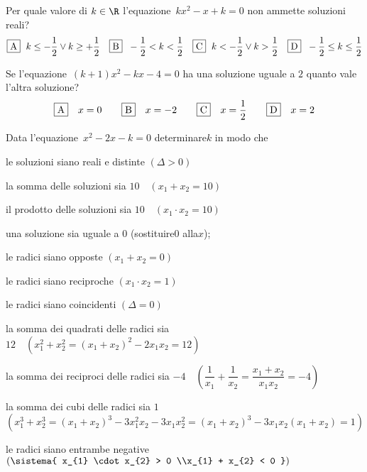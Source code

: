 \begin{esercizio}
 \label{ese:3.105}
 Per quale valore di \(k \in \R\) l'equazione~\(kx^{2}-x + k = 0\) non 
ammette soluzioni reali?
\[\fbox{A}\;~ k \leq-\dfrac{1}{2} \vee k \geq + \dfrac{1}{2}\quad\fbox{B}\;~ 
- 
\dfrac{1}{2} 
< k < \dfrac{1}{2}\quad\fbox{C}\;~ k <-\dfrac{1}{2} \vee k > 
\dfrac{1}{2}\quad\fbox{D}\;~ - 
\dfrac{1}{2} \leq k \leq \dfrac{1}{2}\]
\end{esercizio}

\begin{esercizio}
 \label{ese:3.111}
Se l'equazione~\((k + 1) x^{2}-kx-4 = 0\) ha una soluzione uguale a \(2\) 
quanto 
vale l'altra soluzione?
\[\fbox{A}\quad x = 0\qquad\fbox{B}\quad x =-2\qquad\fbox{C}\quad x = 
\dfrac{1}{2}\qquad\fbox{D}\quad x = 2\]
\end{esercizio}

\begin{esercizio}[*]
 \label{ese:3.97}
Data l'equazione~\(x^{2}-2 x-k = 0\) determinare\(k\) in modo che
\begin{enumeratea}
\item le soluzioni siano reali e distinte \quad\((\Delta>0)\)
\item la somma delle soluzioni sia \(10 \quad (x_{1} + x_{2} = 10)\)
\item il prodotto delle soluzioni sia \(10 \quad (x_{1} \cdot x_{2} = 10)\)
\item una soluzione sia uguale a \(0\) \quad (sostituire\(0\) alla\(x\));~
\item le radici siano opposte \quad \((x_{1} + x_{2} = 0)\)
\item le radici siano reciproche \quad \((x_{1} \cdot x_{2} = 1)\)
\item le radici siano coincidenti \quad \((\Delta=0)\)
\item la somma dei quadrati delle radici sia \(12 \quad \left(x_{1}^{2} + 
x_{2}^{2} = (x_{1} + x_{2})^{2}-2x_{1} x_{2} = 12\right)\)
\item la somma dei reciproci delle radici sia \(-4 \quad 
\left(\dfrac{1}{x_{1}} + 
\dfrac{1}{x_{2}} = \dfrac{x_{1} +x_{2}}{x_{1} x_{2}} =-4 \right)\)
\item la somma dei cubi delle radici sia \(1\) \protect\\ \(\left( 
x_{1}^{3} + 
x_{2}^{3} = (x_{1} + x_{2})^{3}-3x_{1}^{2} x_{2}-3x_{1} x_{2}^{2} = (x_{1} 
+ 
x_{2})^{3}-3x_{1} x_{2} (x_{1} + x_{2}) = 1\right)\)
\item le radici siano entrambe negative \(\left(\sistema{ 
x_{1} 
\cdot x_{2} > 0 \\x_{1} + x_{2} < 0 }\right)\)
\end{enumeratea}
\end{esercizio}

